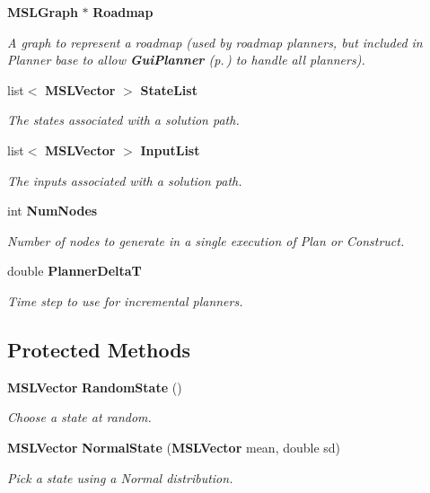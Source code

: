 \begin{CompactItemize}
{\bf MSLGraph} $\ast$ {\bf Roadmap}
\begin{CompactList}\small\item\em A graph to represent a roadmap (used by roadmap planners, but included in Planner base to allow {\bf Gui\-Planner} {\rm (p.\,\pageref{classGuiPlanner})} to handle all planners).\item\end{CompactList}\item 
list$<$ {\bf MSLVector} $>$ {\bf State\-List}
\begin{CompactList}\small\item\em The states associated with a solution path.\item\end{CompactList}\item 
list$<$ {\bf MSLVector} $>$ {\bf Input\-List}
\begin{CompactList}\small\item\em The inputs associated with a solution path.\item\end{CompactList}\item 
int {\bf Num\-Nodes}
\begin{CompactList}\small\item\em Number of nodes to generate in a single execution of Plan or Construct.\item\end{CompactList}\item 
double {\bf Planner\-Delta\-T}
\begin{CompactList}\small\item\em Time step to use for incremental planners.\item\end{CompactList}\end{CompactItemize}
\subsection*{Protected Methods}
\begin{CompactItemize}
\item 
{\bf MSLVector} {\bf Random\-State} ()
\begin{CompactList}\small\item\em Choose a state at random.\item\end{CompactList}\item 
{\bf MSLVector} {\bf Normal\-State} ({\bf MSLVector} mean, double sd)
\begin{CompactList}\small\item\em Pick a state using a Normal distribution.\item\end{CompactList}\end{CompactItemize}
